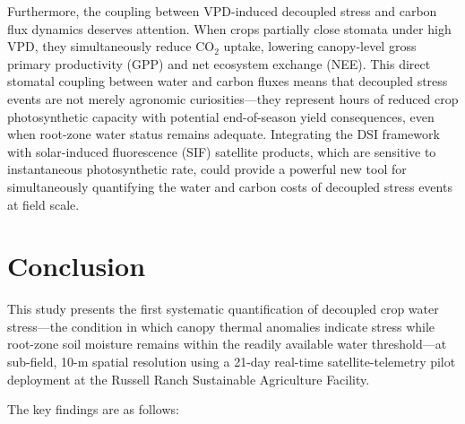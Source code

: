 \documentclass[review,12pt]{elsarticle}
\begin{document}
Furthermore, the coupling between VPD-induced decoupled stress and carbon flux dynamics deserves attention. When crops partially close stomata under high VPD, they simultaneously reduce CO$_2$ uptake, lowering canopy-level gross primary productivity (GPP) and net ecosystem exchange (NEE). This direct stomatal coupling between water and carbon fluxes \citep{katul2012evapotranspiration, vanderTol2009} means that decoupled stress events are not merely agronomic curiosities---they represent hours of reduced crop photosynthetic capacity with potential end-of-season yield consequences, even when root-zone water status remains adequate. Integrating the DSI framework with solar-induced fluorescence (SIF) satellite products, which are sensitive to instantaneous photosynthetic rate, could provide a powerful new tool for simultaneously quantifying the water and carbon costs of decoupled stress events at field scale.

\section{Conclusion}
\label{sec:conclusion}

This study presents the first systematic quantification of decoupled crop water stress---the condition in which canopy thermal anomalies indicate stress while root-zone soil moisture remains within the readily available water threshold---at sub-field, 10-m spatial resolution using a 21-day real-time satellite-telemetry pilot deployment at the Russell Ranch Sustainable Agriculture Facility.

The key findings are as follows:
\end{document}

